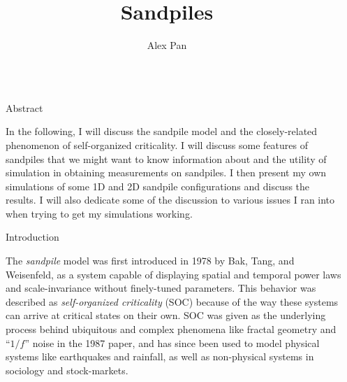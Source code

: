 \documentclass[final]{beamer}
\title{Sandpiles} %
\author{Alex Pan} %
\institute{Reed College} %
\newlength{\sepwid}
\newlength{\onecolwid}
\begin{document}

\setlength{\belowcaptionskip}{2ex} %
\setlength\belowdisplayshortskip{2ex} %

\begin{frame}[t] %

\begin{columns}[t] %

\begin{column}{\sepwid}\end{column} %

\begin{column}{\onecolwid} %


\begin{alertblock}{Abstract}

In the following, I will discuss the sandpile model and the closely-related phenomenon of self-organized criticality. I will discuss some features of sandpiles that we might want to know information about and the utility of simulation in obtaining measurements on sandpiles. I then present my own simulations of some 1D and 2D sandpile configurations and discuss the results. I will also dedicate some of the discussion to various issues I ran into when trying to get my simulations working.

\end{alertblock}


\begin{block}{Introduction}

The \textit{sandpile} model was first introduced in 1978 by Bak, Tang, and Weisenfeld, as a system capable of displaying spatial and temporal power laws and scale-invariance without finely-tuned parameters. This behavior was described as \textit{self-organized criticality} (SOC) because of the way these systems can arrive at critical states on their own. SOC was given as the underlying process behind ubiquitous and complex phenomena like fractal geometry and ``$1/f$'' noise in the 1987 paper, and has since been used to model physical systems like earthquakes and rainfall, as well as non-physical systems in sociology and stock-markets.


\end{block}
\end{column}
\end{columns}
\end{frame}
\end{document}
